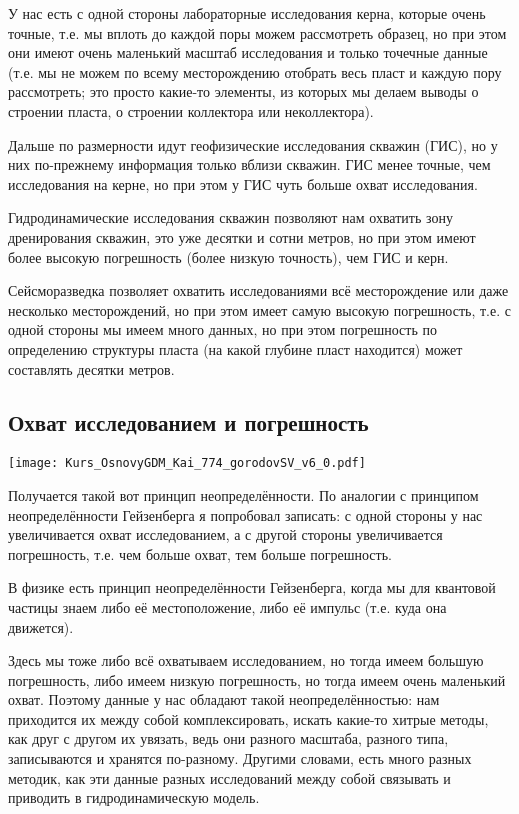\documentclass[main.tex]{subfiles}
\begin{document}
У нас есть с одной стороны лабораторные исследования керна, которые очень точные, т.е. мы вплоть до каждой поры можем рассмотреть образец, но при этом они имеют очень маленький масштаб исследования и только точечные данные (т.е. мы не можем по всему месторождению отобрать весь пласт и каждую пору рассмотреть; это просто какие-то элементы, из которых мы делаем выводы о строении пласта, о строении коллектора или неколлектора).

Дальше по размерности идут геофизические исследования скважин (ГИС), но у них по-прежнему информация только вблизи скважин.
ГИС менее точные, чем исследования на керне, но при этом у ГИС чуть больше охват исследования.

Гидродинамические исследования скважин позволяют нам охватить зону дренирования скважин, это уже десятки и сотни метров, но при этом имеют более высокую погрешность (более низкую точность), чем ГИС и керн.

Сейсморазведка позволяет охватить исследованиями всё месторождение или даже несколько месторождений, но при этом имеет самую высокую погрешность, т.е. с одной стороны мы имеем много данных, но при этом погрешность по определению структуры пласта (на какой глубине пласт находится) может составлять десятки метров.

\subsection{Охват исследованием и погрешность}

\texttt{[image: Kurs\_OsnovyGDM\_Kai\_774\_gorodovSV\_v6\_0.pdf]}

Получается такой вот принцип неопределённости. По аналогии с принципом неопределённости Гейзенберга я попробовал записать: с одной стороны у нас увеличивается охват исследованием, а с другой стороны увеличивается погрешность, т.е. чем больше охват, тем больше погрешность.

В физике есть принцип неопределённости Гейзенберга, когда мы для квантовой частицы знаем либо её местоположение, либо её импульс (т.е. куда она движется).

Здесь мы тоже либо всё охватываем исследованием, но тогда имеем большую погрешность, либо имеем низкую погрешность, но тогда имеем очень маленький охват.
Поэтому данные у нас обладают такой неопределённостью: нам приходится их между собой комплексировать, искать какие-то хитрые методы, как друг с другом их увязать, ведь они разного масштаба, разного типа, записываются и хранятся по-разному.
Другими словами, есть много разных методик, как эти данные разных исследований между собой связывать и приводить в гидродинамическую модель.
\end{document}

